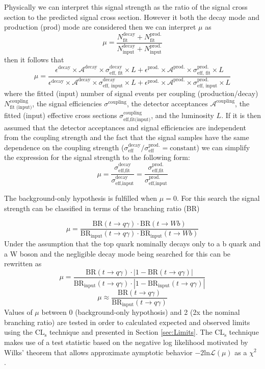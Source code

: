 Physically we can interpret this signal strength as the ratio of the signal cross section to the predicted signal cross section.  However it both the decay mode and production (prod) mode are considered then we can interpret $\mu$ as 
\[\mu = \frac{N_\text{fit}^\text{decay} + N_\text{fit}^\text{prod.}}{N_\text{input}^\text{decay} + N_\text{input}^\text{prod.}}
\]then it follows that 
\[\mu = \frac{\epsilon^\text{decay}\times \mathcal{A}^\text{decay} \times \sigma^\text{decay}_\text{eff, fit}\times L+\epsilon^\text{prod.}\times \mathcal{A}^\text{prod.} \times \sigma^\text{prod.}_\text{eff, fit} \times L}{\epsilon^\text{decay}\times \mathcal{A}^\text{decay} \times \sigma^\text{decay}_\text{eff, input} \times L+\epsilon^\text{prod.}\times \mathcal{A}^\text{prod.} \times \sigma^\text{prod.}_\text{eff, input}\times L}
\]
where the fitted (input) number of signal events per coupling (production/decay) $N_\text{fit (input)}^\text{coupling}$, the signal efficiencies $\sigma^\text{coupling}$, the detector acceptances $\mathcal{A}^\text{coupling}$, the fitted (input) effective cross sections $\sigma_\text{eff,fit(input)}^\text{coupling}$, and the luminosity $L$.  If it is then assumed that the detector acceptances and signal efficiencies are independent from the coupling strength and the fact that the signal samples have the same dependence on the coupling strength ($\sigma_\text{eff}^\text{decay}/ \sigma_\text{eff}^\text{prod.} = \text{constant}$) we can simplify the expression for the signal strength to the following form:
\[ \mu = \frac{\sigma_\text{eff,fit}^\text{decay}}{\sigma_\text{eff,input}^\text{decay}}=\frac{\sigma_\text{eff,fit}^\text{prod.}}{\sigma_\text{eff,input}^\text{prod.}}
\]

The background-only hypothesis is fulfilled when $\mu=0$.
For this search the signal strength can be classified in terms of the branching ratio (BR)

\[ \mu = \frac{\text{BR}(t\rightarrow q\gamma) \cdot \text{BR}(t\rightarrow Wb)}{\text{BR}_\text{input}(t\rightarrow q\gamma) \cdot \text{BR}_\text{input}(t\rightarrow Wb)}
\]
Under the assumption that the top quark nominally decays only to a b quark and a W boson and the negligible decay mode being searched for this can be rewritten as 
\[ \mu = \frac{\text{BR}(t\rightarrow q\gamma) \cdot|1-\text{BR}(t\rightarrow q\gamma)|}{\text{BR}_\text{input}(t\rightarrow q\gamma) \cdot|1-\text{BR}_\text{input}(t\rightarrow q\gamma)|}
\]
\[ \mu \approx \frac{\text{BR}(t\rightarrow q\gamma)}{\text{BR}_\text{input}(t\rightarrow q\gamma)}
\]
Values of $\mu$ between 0 (background-only hypothosis) and 2 (2x the nominal branching ratio) are tested in order to calculated expected and observed limits using the $\text{CL}_\text{s}$ technique\cite{Read:2002hq} and presented in Section \ref{sec:Limits}.  The $\text{CL}_\text{s}$ technique makes use of a test statistic based on the negative log likelihood motivated by  Wilks' theorem that allows approximate aymptotic behavior $-2 \text{ln} \mathcal{L}(\mu)$ as a $\chi^2$ \cite{Wilks:1938dza}. %





